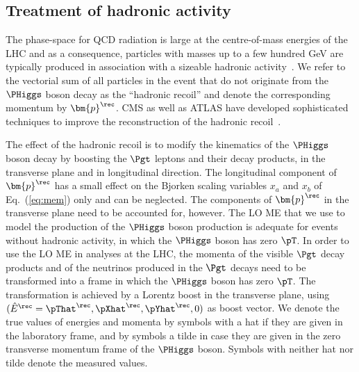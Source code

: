 \subsection{Treatment of hadronic activity}
\label{sec:mem_hadRecoil}

The phase-space for QCD radiation is large at the centre-of-mass
energies of the LHC
and as a consequence, particles with masses up to a few hundred GeV 
are typically produced in association with a sizeable hadronic activity~\cite{Alwall:2010cq}.
We refer to the vectorial sum of all particles in the event that do not originate from the $\PHiggs$ boson decay
as the ``hadronic recoil'' and denote the corresponding momentum by $\bm{p}^{\rec}$.
CMS as well as ATLAS have developed sophisticated techniques to improve the reconstruction 
of the hadronic recoil~\cite{CMS-JME-13-003,ATLAS-CONF-2014-019}.

The effect of the hadronic recoil is to modify the kinematics of the $\PHiggs$ boson decay
by boosting the $\Pgt$ leptons and their decay products,
in the transverse plane and in longitudinal direction.
The longitudinal component of $\bm{p}^{\rec}$ has a small effect on 
the Bjorken scaling variables $x_{a}$ and $x_{b}$ of Eq.~(\ref{eq:mem}) only and can be neglected.
The components of $\bm{p}^{\rec}$ in the transverse plane need to be accounted for, however.
The LO ME that we use to model the production of the $\PHiggs$ boson production 
is adequate for events without hadronic activity,
in which the $\PHiggs$ boson has zero $\pT$.
In order to use the LO ME in analyses at the LHC,
the momenta of the visible $\Pgt$ decay products and of the neutrinos produced in the $\Pgt$ decays
need to be transformed into a frame in which the $\PHiggs$ boson has zero $\pT$.
The transformation is achieved by a Lorentz boost in the transverse plane,
using $(\hat{E}^{\rec} = \pThat^{\rec}, \pXhat^{\rec}, \pYhat^{\rec}, 0)$ as boost
vector.
We denote the true values of energies and momenta by symbols with a
hat if they are given in the laboratory frame, and by symbols a tilde in case they are given in the zero transverse momentum frame of the $\PHiggs$ boson.
Symbols with neither hat nor tilde denote the measured values.

